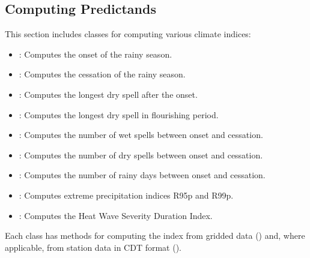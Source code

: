 \documentclass[letterpaper,10pt,english]{sphinxmanual}
\begin{document}
\subsection{Computing Predictands}
\label{\detokenize{Processing:computing-predictands}}
\sphinxAtStartPar
This section includes classes for computing various climate indices:
\begin{itemize}
\item {} 
\sphinxAtStartPar
{}: Computes the onset of the rainy season.

\item {} 
\sphinxAtStartPar
{}: Computes the cessation of the rainy season.

\item {} 
\sphinxAtStartPar
{}: Computes the longest dry spell after the onset.

\item {} 
\sphinxAtStartPar
{}: Computes the longest dry spell in flourishing period.

\item {} 
\sphinxAtStartPar
{}: Computes the number of wet spells between onset and cessation.

\item {} 
\sphinxAtStartPar
{}: Computes the number of dry spells between onset and cessation.

\item {} 
\sphinxAtStartPar
{}: Computes the number of rainy days between onset and cessation.

\item {} 
\sphinxAtStartPar
{}: Computes extreme precipitation indices R95p and R99p.

\item {} 
\sphinxAtStartPar
{}: Computes the Heat Wave Severity Duration Index.

\end{itemize}

\sphinxAtStartPar
Each class has methods for computing the index from gridded data () and, where applicable, from station data in CDT format ().
\end{document}
